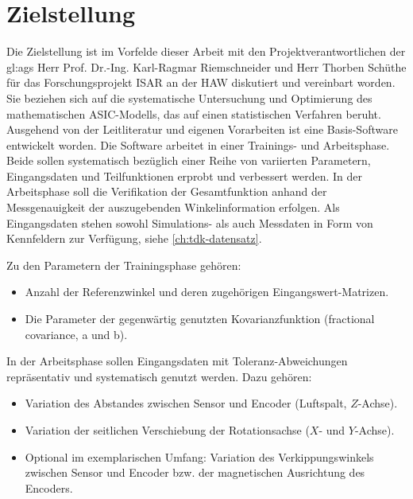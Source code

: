 %

\section{Zielstellung}\label{sec:zielstellung}


Die Zielstellung ist im Vorfelde dieser Arbeit mit den Projektverantwortlichen der \gls{gl:ags} Herr Prof. Dr.-Ing. Karl-Ragmar Riemschneider und Herr Thorben Schüthe für das Forschungsprojekt ISAR an der HAW diskutiert und vereinbart worden. Sie beziehen sich auf die systematische Untersuchung und Optimierung des mathematischen ASIC-Modells, das auf einen statistischen Verfahren beruht. Ausgehend von der Leitliteratur \cite{Rasmussen2006} und eigenen Vorarbeiten \cite{Schuethe2019}\cite{Schuethe2020b}\cite{Schuethe2020}\cite{Schuethe2020a} ist eine Basis-Software entwickelt worden. Die Software arbeitet in einer Trainings- und Arbeitsphase. Beide sollen
systematisch bezüglich einer Reihe von variierten Parametern, Eingangsdaten und Teilfunktionen erprobt und verbessert werden. In der Arbeitsphase soll die Verifikation der Gesamtfunktion anhand
der Messgenauigkeit der auszugebenden Winkelinformation erfolgen. Als Eingangsdaten stehen sowohl
Simulations- als auch Messdaten in Form von Kennfeldern zur Verfügung, siehe \autoref{ch:tdk-datensatz}.


Zu den Parametern der Trainingsphase gehören:

\begin{itemize}
	\item Anzahl der Referenzwinkel und deren zugehörigen Eingangswert-Matrizen.
	\item Die Parameter der gegenwärtig genutzten Kovarianzfunktion (fractional covariance, a und b).
\end{itemize}


In der Arbeitsphase sollen Eingangsdaten mit Toleranz-Abweichungen repräsentativ und systematisch
genutzt werden. Dazu gehören:

\begin{itemize}
	\item Variation des Abstandes zwischen Sensor und Encoder (Luftspalt, $Z$-Achse).
	\item Variation der seitlichen Verschiebung der Rotationsachse ($X$- und $Y$-Achse).
	\item Optional im exemplarischen Umfang: Variation des Verkippungswinkels zwischen Sensor und Encoder bzw. der magnetischen Ausrichtung des Encoders.
\end{itemize}

